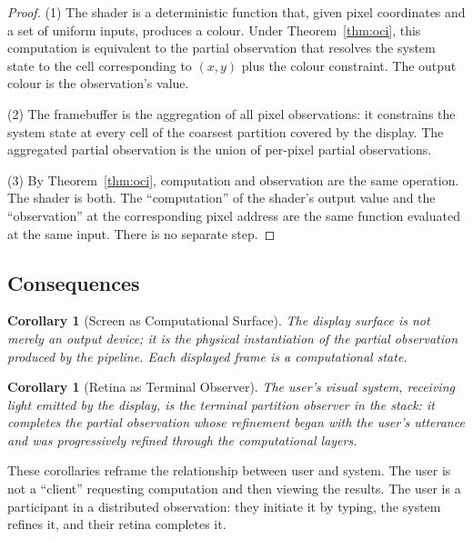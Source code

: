 \documentclass[11pt,twocolumn,a4paper]{article}
\newtheorem{corollary}[theorem]{Corollary}
\theoremstyle{definition}
\theoremstyle{remark}
\begin{document}
\begin{proof}
(1) The shader is a deterministic function that, given pixel coordinates and a set of uniform inputs, produces a colour. Under Theorem~\ref{thm:oci}, this computation is equivalent to the partial observation that resolves the system state to the cell corresponding to $(x,y)$ plus the colour constraint. The output colour is the observation's value.

(2) The framebuffer is the aggregation of all pixel observations: it constrains the system state at every cell of the coarsest partition covered by the display. The aggregated partial observation is the union of per-pixel partial observations.

(3) By Theorem~\ref{thm:oci}, computation and observation are the same operation. The shader is both. The ``computation'' of the shader's output value and the ``observation'' at the corresponding pixel address are the same function evaluated at the same input. There is no separate step.
\end{proof}

\subsection{Consequences}

\begin{corollary}[Screen as Computational Surface]
\label{cor:screen}
The display surface is not merely an output device; it is the physical instantiation of the partial observation produced by the pipeline. Each displayed frame is a computational state.
\end{corollary}

\begin{corollary}[Retina as Terminal Observer]
\label{cor:retina}
The user's visual system, receiving light emitted by the display, is the terminal partition observer in the stack: it completes the partial observation whose refinement began with the user's utterance and was progressively refined through the computational layers.
\end{corollary}

These corollaries reframe the relationship between user and system. The user is not a ``client'' requesting computation and then viewing the results. The user is a participant in a distributed observation: they initiate it by typing, the system refines it, and their retina completes it.
\end{document}
